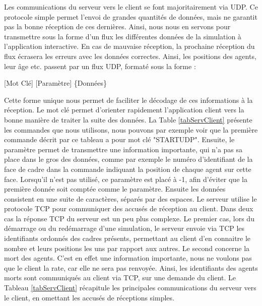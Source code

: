 	Les communications du serveur vers le client se font majoritairement via UDP. Ce protocole simple permet l'envoi de grandes quantités de données, mais ne garantit pas la bonne réception de ces dernières. Ainsi, nous nous en servons pour transmettre sous la forme d'un flux les différentes données de la simulation à l'application interactive. En cas de mauvaise réception, la prochaine réception du flux écrasera les erreurs avec les données correctes. Ainsi, les positions des agents, leur âge etc. passent par un flux UDP, formaté sous la forme :	
	\begin{center}
		[Mot Clé] [Paramètre] \{Données\}
	\end{center}
	Cette forme unique nous permet de faciliter le décodage de ces informations à la réception. Le mot clé permet d'orienter rapidement l'application client vers la bonne manière de traiter la suite des données. La Table \ref{tabServClient} présente les commandes que nous utilisons, nous pouvons par exemple voir que la première commande décrit par ce tableau a pour mot clé "STARTUDP". Ensuite, le paramètre permet de transmettre une information importante, qui n'a pas sa place dans le gros des données, comme par exemple le numéro d'identifiant de la face de cadre dans la commande indiquant la position de chaque agent sur cette face. Lorsqu'il n'est pas utilisé, ce paramètre est placé à -1, afin d'éviter que la première donnée soit comptée comme le paramètre. Ensuite les données consistent en une suite de caractères, séparés par des espaces. 
	Le serveur utilise le protocole TCP pour communiquer des accusés de réception au client. Dans deux cas la réponse TCP du serveur est un peu plus complexe. Le premier cas, lors du démarrage ou du redémarrage d'une simulation, le serveur envoie via TCP les identifiants ordonnés des cadres présents, permettant au client d'en connaitre le nombre et leurs positions les uns par rapport aux autres. Le second concerne la mort des agents. C'est en effet une information importante, nous ne voulons pas que le client la rate, car elle ne sera pas renvoyée. Ainsi, les identifiants des agents morts sont communiqués au client via TCP, sur une demande du client. 
	Le Tableau \ref{tabServClient} récapitule les principales communications du serveur vers le client, en omettant les accusés de réceptions simples.
	
